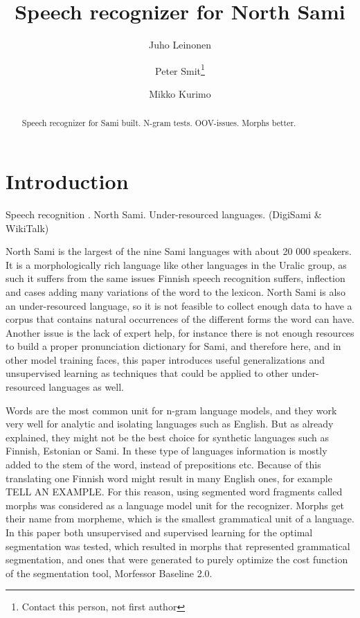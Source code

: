 \documentclass[10pt,b5paper]{article}
\begin{document}
\title{Speech recognizer for North Sami} \author{Juho Leinonen \and Peter Smit\footnote{Contact this person, not first author} \and Mikko Kurimo} \maketitle

\begin{abstract} Speech recognizer for Sami built. N-gram tests. OOV-issues. Morphs better. \end{abstract}

\section{Introduction}

Speech recognition \cite{huang2001spoken}. North Sami. Under-resourced languages. (DigiSami \& WikiTalk)

North Sami is the largest of the nine Sami languages with about 20 000 speakers. It is a morphologically rich language like other languages in the Uralic group, as such it suffers from the same issues Finnish speech recognition suffers, inflection and cases adding many variations of the word to the lexicon. North Sami is also an under-resourced language, so it is not feasible to collect enough data to have a corpus that contains natural occurrences of the different forms the word can have. Another issue is the lack of expert help, for instance there is not enough resources to build a proper pronunciation dictionary for Sami, and therefore here, and in other model training faces, this paper introduces useful generalizations and unsupervised learning as techniques that could be applied to other under-resourced languages as well.

Words are the most common unit for n-gram language models, and they work very well for analytic and isolating languages such as English. But as already explained, they might not be the best choice for synthetic languages such as Finnish, Estonian or Sami. In these type of languages information is mostly added to the stem of the word, instead of prepositions etc. Because of this translating one Finnish word might result in many English ones, for example TELL AN EXAMPLE. For this reason, using segmented word fragments called morphs was considered as a language model unit for the recognizer. Morphs get their name from morpheme, which is the smallest grammatical unit of a language. In this paper both unsupervised and supervised learning for the optimal segmentation was tested, which resulted in morphs that represented grammatical segmentation, and ones that were generated to purely optimize the cost function of the segmentation tool, Morfessor Baseline 2.0.
\end{document}
